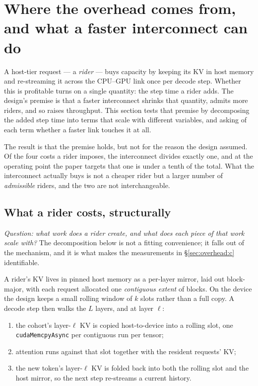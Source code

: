 %
\section{Where the overhead comes from, and what a faster interconnect can do}
\label{sec:overhead}

A host-tier request --- a \emph{rider} --- buys capacity by keeping its KV in
host memory and re-streaming it across the CPU--GPU link once per decode step.
Whether this is profitable turns on a single quantity: the step time a rider
adds. The design's premise is that a faster interconnect shrinks that quantity,
admits more riders, and so raises throughput. This section tests that premise by
decomposing the added step time into terms that scale with different variables,
and asking of each term whether a faster link touches it at all.

The result is that the premise holds, but not for the reason the design assumed.
Of the four costs a rider imposes, the interconnect divides exactly one, and at
the operating point the paper targets that one is under a tenth of the total.
What the interconnect actually buys is not a cheaper rider but a larger number
of \emph{admissible} riders, and the two are not interchangeable.

\subsection{What a rider costs, structurally}
\label{sec:overhead:anatomy}

\emph{Question: what work does a rider create, and what does each piece of that
work scale with?} The decomposition below is not a fitting convenience; it falls
out of the mechanism, and it is what makes the measurements in
\S\ref{sec:overhead:c} identifiable.

A rider's KV lives in pinned host memory as a per-layer mirror, laid out
block-major, with each request allocated one \emph{contiguous extent} of blocks.
On the device the design keeps a small rolling window of $k$ slots rather than a
full copy. A decode step then walks the $L$ layers, and at layer $\ell$:

\begin{enumerate}
\itemsep2pt
\item the cohort's layer-$\ell$ KV is copied host-to-device into a rolling slot,
      one \texttt{cudaMemcpyAsync} per contiguous run per tensor;
\item attention runs against that slot together with the resident requests' KV;
\item the new token's layer-$\ell$ KV is folded back into both the rolling slot
      and the host mirror, so the next step re-streams a current history.
\end{enumerate}

